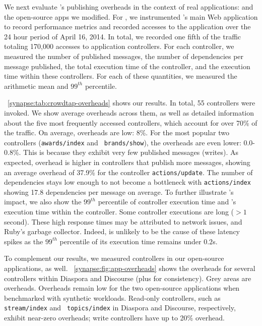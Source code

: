We next evaluate \synapse's publishing overheads in the context of real
applications: \crowdtap and the open-source apps we modified. For \crowdtap, we
instrumented \crowdtap's main Web application to record performance metrics and
recorded accesses to the application over the 24 hour period of April 16,
2014. In total, we recorded one fifth of the traffic totaling 170,000 accesses
to application controllers. For each controller, we measured the
number of published messages, the number of dependencies per message
published, the total execution time of the controller, and the
\synapse execution time within these controllers.
For each of these quantities, we measured the arithmetic mean and $99^{th}$  percentile.

\F~\ref{synapse:tab:crowdtap-overheads} shows our results. In total, 55 controllers
were invoked. We show average overheads across them, as well as detailed
information about the five most frequently accessed controllers, which account
for over 70\% of the traffic. On average, \synapse overheads are low: 8\%.
For the most popular two controllers ({\tt awards/index} and {\tt
brands/show}), the overheads are even lower: 0.0-0.8\%. This is because they
exhibit very few published messages (writes). As expected, \synapse overhead
is higher in controllers that publish more messages, showing an average overhead
of 37.9\% for the controller {\tt actions/update}.
The number of dependencies stays low enough to not become a bottleneck with
{\tt actions/index} showing 17.8 dependencies per message on average.
To further illustrate \synapse's impact, we also show the $99^{th}$ percentile
of controller execution time and \synapse's execution time within the controller.
Some controller executions are long ($>1$ second). These high response times may
be attributed to network issues, and Ruby's garbage collector.
Indeed, \synapse is unlikely to be the cause of these latency spikes as the
$99^{th}$ percentile of its execution time remains under $0.2$s.

To complement our \crowdtap results, we measured controllers in our open-source
applications, as well. \F~\ref{synapse:fig:app-overheads} shows the \synapse
overheads for several controllers within Diaspora and Discourse (plus
\crowdtap for consistency). Grey areas are \synapse overheads. Overheads
remain low for the two open-source applications when benchmarked with synthetic
workloads. Read-only controllers, such as {\tt stream/index} and {\tt
topics/index} in Diaspora and Discourse, respectively, exhibit near-zero
overheads; write controllers have up to 20\% overhead.

